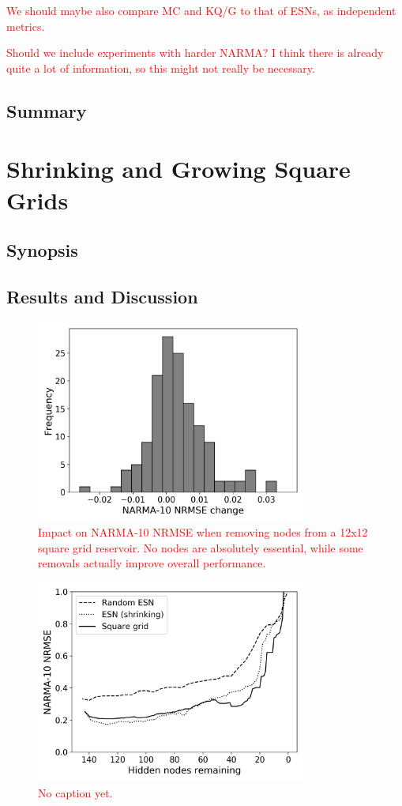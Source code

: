 \textcolor{red}{
  We should maybe also compare MC and KQ/G to that of ESNs, as independent
metrics.
}

\textcolor{red}{
  Should we include experiments with harder NARMA? I think there is already
quite a lot of information, so this might not really be necessary.
}

\subsection{Summary}

\section{Shrinking and Growing Square Grids}

\subsection{Synopsis}

\subsection{Results and Discussion}

\begin{figure}
  \centering
  \includegraphics[width=3.5in]{figures/removal-hist.png}
  \caption{
    \textcolor{red}{
      Impact on NARMA-10 NRMSE when removing nodes from a 12x12 square grid
reservoir. No nodes are absolutely essential, while some removals actually
improve overall performance.
    }
  }
  \label{fig:rt-removal-hist}
\end{figure}

\begin{figure}
  \centering
  \includegraphics[width=3.5in]{figures/shrink-performance.png}
  \caption{
    \textcolor{red}{
      No caption yet.
    }
  }
  \label{fig:sq-shrink-performance}
\end{figure}

